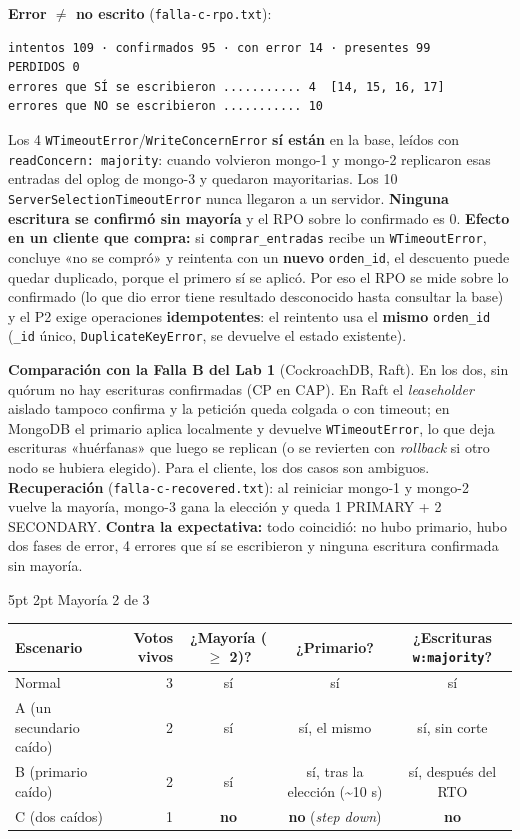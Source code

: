 \documentclass[10pt,letterpaper]{article}
\makeatletter
\renewcommand\subsection{\@startsection{subsection}{2}{\z@}%
  {5pt \@plus 1pt}{2pt}%
  {\normalfont\small\bfseries\color{acc}}}
\makeatother
\begin{document}
\textbf{Error $\neq$ no escrito} (\texttt{falla-c-rpo.txt}):
\begin{Verbatim}
intentos 109 · confirmados 95 · con error 14 · presentes 99
PERDIDOS 0
errores que SÍ se escribieron ........... 4  [14, 15, 16, 17]
errores que NO se escribieron ........... 10
\end{Verbatim}
Los 4 \texttt{WTimeoutError}/\texttt{WriteConcernError} \textbf{sí están} en la base, leídos con
\texttt{readConcern: majority}: cuando volvieron mongo-1 y mongo-2 replicaron esas entradas del oplog de
mongo-3 y quedaron mayoritarias. Los 10 \texttt{ServerSelectionTimeoutError} nunca llegaron a un servidor.
\textbf{Ninguna escritura se confirmó sin mayoría} y el RPO sobre lo confirmado es 0. \textbf{Efecto en un
cliente que compra:} si \texttt{comprar\_entradas} recibe un \texttt{WTimeoutError}, concluye «no se compró»
y reintenta con un \textbf{nuevo} \texttt{orden\_id}, el descuento puede quedar duplicado, porque el primero
sí se aplicó. Por eso el RPO se mide sobre lo confirmado (lo que dio error tiene resultado desconocido hasta
consultar la base) y el P2 exige operaciones \textbf{idempotentes}: el reintento usa el \textbf{mismo}
\texttt{orden\_id} (\texttt{\_id} único, \texttt{DuplicateKeyError}, se devuelve el estado existente).

\textbf{Comparación con la Falla B del Lab 1} (CockroachDB, Raft). En los dos, sin quórum no hay escrituras
confirmadas (CP en CAP). En Raft el \emph{leaseholder} aislado tampoco confirma y la petición queda colgada o
con timeout; en MongoDB el primario aplica localmente y devuelve \texttt{WTimeoutError}, lo que deja
escrituras «huérfanas» que luego se replican (o se revierten con \emph{rollback} si otro nodo se hubiera
elegido). Para el cliente, los dos casos son ambiguos. \textbf{Recuperación}
(\texttt{falla-c-recovered.txt}): al reiniciar mongo-1 y mongo-2 vuelve la mayoría, mongo-3 gana la elección
y queda 1 PRIMARY + 2 SECONDARY. \textbf{Contra la expectativa:} todo coincidió: no hubo primario, hubo dos fases de
error, 4 errores que sí se escribieron y ninguna escritura confirmada sin mayoría.

\subsection{Mayoría 2 de 3}

\begin{center}\footnotesize
\begin{tabular}{@{}lrccc@{}}
\toprule
\textbf{Escenario} & \textbf{Votos vivos} & \textbf{¿Mayoría ($\geq$ 2)?} & \textbf{¿Primario?} & \textbf{¿Escrituras \texttt{w:majority}?} \\
\midrule
Normal & 3 & sí & sí & sí \\
A (un secundario caído) & 2 & sí & sí, el mismo & sí, sin corte \\
B (primario caído) & 2 & sí & sí, tras la elección (\textasciitilde 10 s) & sí, después del RTO \\
C (dos caídos) & 1 & \textbf{no} & \textbf{no} (\emph{step down}) & \textbf{no} \\
\bottomrule
\end{tabular}
\end{center}
\end{document}
